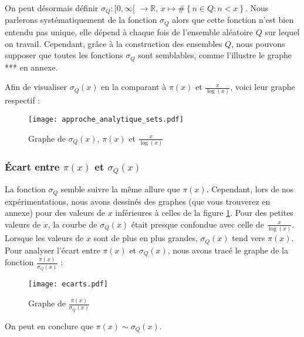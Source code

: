 \documentclass[../main.tex]{report}
\begin{document}
On peut désormais définir $ \sigma_{Q} : [0, \infty [$  $\rightarrow \mathbb{R} $, $ x \mapsto \# \left\{ n \in Q : n < x \right\} $. Nous parlerons systématiquement de  la fonction $\sigma_{Q}$ alors que cette fonction n'est bien entendu pas unique, elle dépend à chaque fois de l'ensemble aléatoire $Q$ sur lequel on travail. Cependant, grâce à la construction des ensembles $Q$, nous pouvons supposer que toutes les fonctions $\sigma_{Q}$ sont semblables, comme l'illustre le graphe *** en annexe. 

Afin de visualiser  $\sigma_{Q}(x)$ en la comparant à $\pi(x)$ et $\frac{x}{\log(x)}$, voici leur graphe respectif : 

\begin{figure}[H]
 \centering
 \texttt{[image: approche\_analytique\_sets.pdf]}
 \caption{Graphe de $\sigma_{Q}(x)$, $\pi(x)$ et $\frac{x}{\log(x)}$ }
 \label{im:image1}
\end{figure}

\subsubsection{Écart entre $\pi(x)$ et $\sigma_{Q}(x)$}

La fonction $\sigma_{Q}$ semble suivre la même allure que $\pi(x)$. Cependant, lors de nos expérimentations, nous avons dessinés des graphes (que vous trouverez en annexe) pour des valeurs de $x$ inférieures à celles de la figure \ref{im:image1}. Pour des petites valeurs de $x$, la courbe de $\sigma_{Q}(x)$ était presque confondue avec celle de $\frac{x}{\log(x)}$. Lorsque les valeurs de $x$ sont de plus en plus grandes, $\sigma_{Q}(x)$ tend vers $\pi(x)$. Pour analyser l'écart entre $\pi(x)$ et $\sigma_{Q}(x)$, nous avons tracé le graphe de la fonction $\frac{\pi(x)}{\sigma_{Q}(x)}$ : 

\begin{figure}[H]
 \centering
 \texttt{[image: ecarts.pdf]}
 \caption{Graphe de $\frac{\pi(x)}{\sigma_{Q}(x)}$ }
 \label{im:image2}
 \end{figure}
On peut en conclure que $ \pi(x) \sim \sigma_{Q}(x) $.
\end{document}

